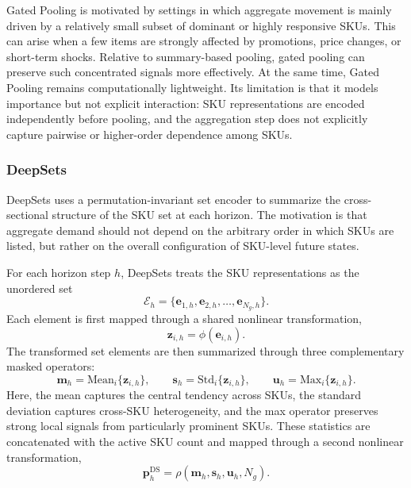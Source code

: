 \documentclass[12pt]{article}
\begin{document}
Gated Pooling is motivated by settings in which aggregate movement is mainly driven by a relatively small subset of dominant or highly responsive SKUs. This can arise when a few items are strongly affected by promotions, price changes, or short-term shocks. Relative to summary-based pooling, gated pooling can preserve such concentrated signals more effectively. At the same time, Gated Pooling remains computationally lightweight. Its limitation is that it models importance but not explicit interaction: SKU representations are encoded independently before pooling, and the aggregation step does not explicitly capture pairwise or higher-order dependence among SKUs.

\subsubsection{ DeepSets}
\label{subsec:tds}

DeepSets uses a permutation-invariant set encoder \parencite{zaheer2017deep} to summarize the cross-sectional structure of the SKU set at each horizon. The motivation is that aggregate demand should not depend on the arbitrary order in which SKUs are listed, but rather on the overall configuration of SKU-level future states.

For each horizon step $h$, DeepSets treats the SKU representations as the unordered set
\begin{equation}
  \mathcal{E}_h
  =
  \{\mathbf{e}_{1,h}, \mathbf{e}_{2,h}, \ldots, \mathbf{e}_{N_g,h}\}.
\end{equation}
Each element is first mapped through a shared nonlinear transformation,
\begin{equation}
  \mathbf{z}_{i,h}
  =
  \phi(\mathbf{e}_{i,h}).
\end{equation}
The transformed set elements are then summarized through three complementary masked operators:
\begin{equation}
  \mathbf{m}_h
  =
  \mathrm{Mean}_i\{\mathbf{z}_{i,h}\},
  \qquad
  \mathbf{s}_h
  =
  \mathrm{Std}_i\{\mathbf{z}_{i,h}\},
  \qquad
  \mathbf{u}_h
  =
  \mathrm{Max}_i\{\mathbf{z}_{i,h}\}.
\end{equation}
Here, the mean captures the central tendency across SKUs, the standard deviation captures cross-SKU heterogeneity, and the max operator preserves strong local signals from particularly prominent SKUs. These statistics are concatenated with the active SKU count and mapped through a second nonlinear transformation,
\begin{equation}
  \mathbf{p}^{\mathrm{DS}}_h
  =
  \rho
  \left(
  \mathbf{m}_h,
  \mathbf{s}_h,
  \mathbf{u}_h,
  N_g
  \right).
\end{equation}
\end{document}
